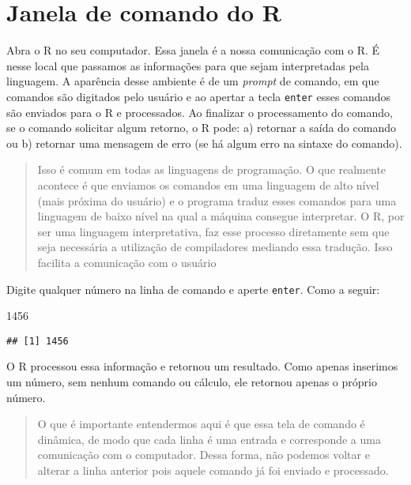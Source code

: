 \documentclass[]{book}
\newenvironment{Shaded}{\begin{snugshade}}{\end{snugshade}}
\newcommand{\DecValTok}[1]{\textcolor[rgb]{0.00,0.00,0.81}{#1}}
\theoremstyle{definition}
\theoremstyle{definition}
\theoremstyle{definition}
\theoremstyle{remark}
\begin{document}
\hypertarget{janela-de-comando-do-r}{%
\section{Janela de comando do R}\label{janela-de-comando-do-r}}

Abra o R no seu computador. Essa janela é a nossa comunicação com o R. É nesse local que passamos as informações para que sejam interpretadas pela linguagem. A aparência desse ambiente é de um \emph{prompt} de comando, em que comandos são digitados pelo usuário e ao apertar a tecla \texttt{enter} esses comandos são enviados para o R e processados. Ao finalizar o processamento do comando, se o comando solicitar algum retorno, o R pode: a) retornar a saída do comando ou b) retornar uma mensagem de erro (se há algum erro na sintaxe do comando).

\begin{quote}
Isso é comum em todas as linguagens de programação. O que realmente acontece é que enviamos os comandos em uma linguagem de alto nível (mais próxima do usuário) e o programa traduz esses comandos para uma linguagem de baixo nível na qual a máquina consegue interpretar. O R, por ser uma linguagem interpretativa, faz esse processo diretamente sem que seja necessária a utilização de compiladores mediando essa tradução. Isso facilita a comunicação com o usuário
\end{quote}

Digite qualquer número na linha de comando e aperte \texttt{enter}. Como a seguir:

\begin{Shaded}
\begin{Highlighting}[]
\DecValTok{1456}
\end{Highlighting}
\end{Shaded}

\begin{verbatim}
## [1] 1456
\end{verbatim}

O R processou essa informação e retornou um resultado. Como apenas inserimos um número, sem nenhum comando ou cálculo, ele retornou apenas o próprio número.

\begin{quote}
O que é importante entendermos aqui é que essa tela de comando é dinâmica, de modo que cada linha é uma entrada e corresponde a uma comunicação com o computador. Dessa forma, não podemos voltar e alterar a linha anterior pois aquele comando já foi enviado e processado.
\end{quote}
\end{document}
